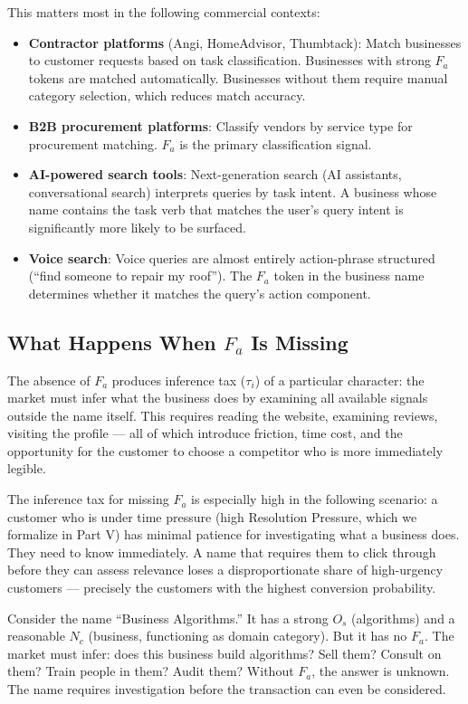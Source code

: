 \documentclass[12pt, openany]{book}
\theoremstyle{thmstyle}
\theoremstyle{defstyle}
\newcommand{\Nc}{N_c}
\newcommand{\Os}{O_s}
\newcommand{\Fa}{F_a}
\newcommand{\taui}{\tau_i}
\begin{document}
This matters most in the following commercial contexts:
\begin{itemize}[leftmargin=1.5em]
  \item \textbf{Contractor platforms} (Angi, HomeAdvisor, Thumbtack): Match businesses to customer requests based on task classification. Businesses with strong $\Fa$ tokens are matched automatically. Businesses without them require manual category selection, which reduces match accuracy.
  \item \textbf{B2B procurement platforms}: Classify vendors by service type for procurement matching. $\Fa$ is the primary classification signal.
  \item \textbf{AI-powered search tools}: Next-generation search (AI assistants, conversational search) interprets queries by task intent. A business whose name contains the task verb that matches the user's query intent is significantly more likely to be surfaced.
  \item \textbf{Voice search}: Voice queries are almost entirely action-phrase structured (``find someone to repair my roof''). The $\Fa$ token in the business name determines whether it matches the query's action component.
\end{itemize}

\subsection{What Happens When $F_a$ Is Missing}

The absence of $\Fa$ produces inference tax ($\taui$) of a particular character: the market must infer what the business does by examining all available signals outside the name itself. This requires reading the website, examining reviews, visiting the profile --- all of which introduce friction, time cost, and the opportunity for the customer to choose a competitor who is more immediately legible.

The inference tax for missing $\Fa$ is especially high in the following scenario: a customer who is under time pressure (high Resolution Pressure, which we formalize in Part V) has minimal patience for investigating what a business does. They need to know immediately. A name that requires them to click through before they can assess relevance loses a disproportionate share of high-urgency customers --- precisely the customers with the highest conversion probability.

Consider the name ``Business Algorithms.'' It has a strong $\Os$ (algorithms) and a reasonable $\Nc$ (business, functioning as domain category). But it has no $\Fa$. The market must infer: does this business build algorithms? Sell them? Consult on them? Train people in them? Audit them? Without $\Fa$, the answer is unknown. The name requires investigation before the transaction can even be considered.
\end{document}
